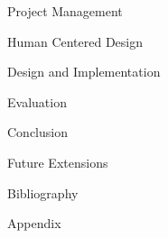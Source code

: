 \documentclass[twoside, a4paper, titlepage]{article}
\begin{document}
\newpage
\begin{section}{Project Management}

\end{section}

\newpage
\begin{section}{Human Centered Design}

\end{section}

\newpage
\begin{section}{Design and Implementation}

\end{section}

\newpage
\begin{section}{Evaluation}

\end{section}

\newpage
\begin{section}{Conclusion}

\end{section}

\newpage
\begin{section}{Future Extensions}

\end{section}

\newpage
\begin{section}{Bibliography}

\end{section}

\newpage
\begin{section}{Appendix}

\end{section}

\end{document}
